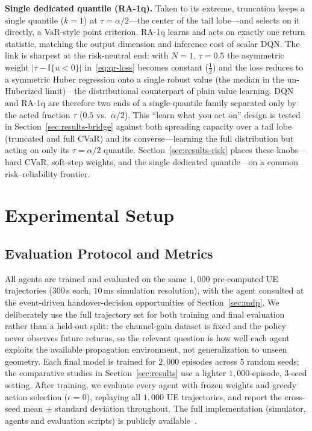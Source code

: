 \documentclass[conference]{IEEEtran}
\begin{document}
\textbf{Single dedicated quantile (RA-1q).} Taken to its extreme, truncation
keeps a single quantile ($k{=}1$) at $\tau=\alpha/2$---the center of the tail
lobe---and selects on it directly, a VaR-style point criterion. RA-1q learns and
acts on exactly one return statistic, matching the output dimension and inference
cost of scalar DQN. The link is sharpest at the risk-neutral end: with
$N{=}1,\,\tau{=}0.5$ the asymmetric weight $|\tau-\mathbb{I}\{u<0\}|$
in~\eqref{eq:qr-loss} becomes constant ($\tfrac12$) and the loss reduces to a
symmetric Huber regression onto a single robust value (the median in the
un-Huberized limit)---the distributional counterpart of plain value learning. DQN
and RA-1q are therefore two ends of a single-quantile family separated only by the
acted fraction $\tau$ ($0.5$ vs.\ $\alpha/2$). This ``learn what you act on''
design is tested in Section~\ref{sec:results-bridge} against both spreading
capacity over a tail lobe (truncated and full CVaR) and its converse---learning
the full distribution but acting on only its $\tau{=}\alpha/2$ quantile.
Section~\ref{sec:results-risk} places these knobs---hard CVaR, soft-step weights,
and the single dedicated quantile---on a common risk--reliability frontier.


\section{Experimental Setup}
\label{sec:setup}

\subsection{Evaluation Protocol and Metrics}
All agents are trained and evaluated on the same $1{,}000$ pre-computed UE
trajectories ($300$\,s each, $10$\,ms simulation resolution), with the agent
consulted at the event-driven handover-decision opportunities of
Section~\ref{sec:mdp}. We deliberately use the full trajectory set for both
training and final evaluation rather than a held-out split: the channel-gain
dataset is fixed and the policy never observes future returns, so the relevant
question is how well each agent exploits the available propagation environment,
not generalization to unseen geometry. Each final model is trained for $2{,}000$
episodes across $5$ random seeds; the comparative studies in
Section~\ref{sec:results} use a lighter $1{,}000$-episode, $3$-seed setting. After
training, we evaluate every agent with frozen weights and greedy action selection
($\epsilon{=}0$), replaying all $1{,}000$ UE trajectories, and report the
cross-seed mean $\pm$ standard deviation throughout. The full implementation
(simulator, agents and evaluation scripts) is publicly available~\cite{code}.
\end{document}

